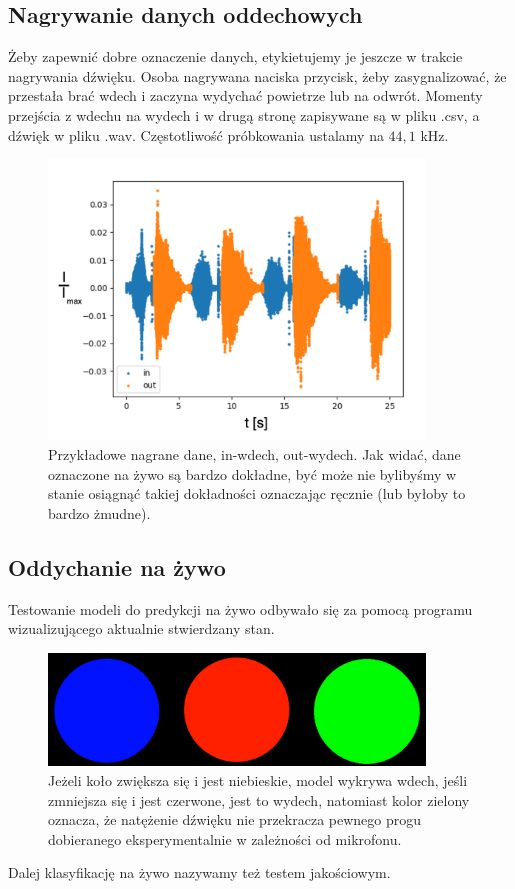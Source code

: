 \documentclass[polish]{article}
\begin{document}
\subsection{Nagrywanie danych oddechowych}
Żeby zapewnić dobre oznaczenie danych, etykietujemy je jeszcze w trakcie nagrywania dźwięku. 
Osoba nagrywana naciska przycisk, żeby zasygnalizować, że przestała brać wdech i zaczyna wydychać 
powietrze lub na odwrót. Momenty przejścia z wdechu na wydech i w drugą stronę zapisywane są w pliku
.csv, a dźwięk w pliku .wav. Częstotliwość próbkowania ustalamy na $44,1$ kHz.
\begin{figure}[H]
	\centering
	\includegraphics[width=10cm]{nagrywanie_ozn}
	\caption{Przykładowe nagrane dane, in-wdech, out-wydech. Jak widać, dane oznaczone na żywo są bardzo dokładne, być może nie bylibyśmy w stanie osiągnąć takiej
dokładności oznaczając ręcznie (lub byłoby to bardzo żmudne).}
\end{figure}
\subsection{Oddychanie na żywo}
Testowanie modeli do predykcji na żywo odbywało się za pomocą programu wizualizującego aktualnie
stwierdzany stan. 
\begin{figure}[H]
	\centering
	\includegraphics[width=10cm]{wdechwydechcisza}
	\caption{Jeżeli koło zwiększa się i jest niebieskie, model wykrywa wdech, jeśli zmniejsza się i jest czerwone, jest to wydech, natomiast kolor zielony oznacza, że natężenie dźwięku nie przekracza pewnego  progu dobieranego eksperymentalnie w zależności od mikrofonu.}
\end{figure}
Dalej klasyfikację na żywo nazywamy też testem jakościowym.
\end{document}
